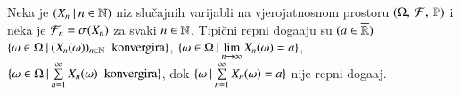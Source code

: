 \begin{pr}  \label{pr:9.8}
    Neka je $({X_n} \: | \: {n \in \mathbb{N}})$ niz slu\v cajnih varijabli na vjerojatnosnom prostoru $(\Omega, \: \mathcal{F}, \: \mathbb{P})$ i neka je $\mathcal{F}_n = \sigma({X_n})$ za svaki $n \in \mathbb{N}$.
    Tipi\v cni repni doga\dj aju su $(a \in \overline{\mathbb{R}})$ $\{{\omega \in \Omega} \: | \: {(X_n(\omega))_{n \in \mathbb{N}} \; \textnormal{ konvergira}}\}$, $\{{\omega \in \Omega} \: | \: {\lim\limits_{n \to \infty} X_n(\omega) = a}\}$, $\{{\omega \in \Omega} \: | \: {\sum\limits_{n = 1}^{\infty} X_n(\omega) \; \textnormal{ konvergira}}\}$, dok $\{{\omega} \: | \: {\sum\limits_{n = 1}^{\infty} X_n (\omega) = a}\}$ nije repni doga\dj aj.
\end{pr}
